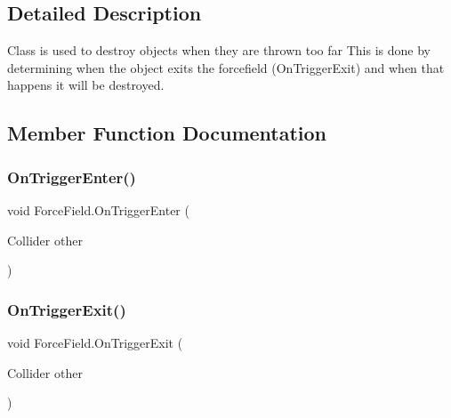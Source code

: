\subsection{Detailed Description}
Class is used to destroy objects when they are thrown too far This is done by determining when the object exits the forcefield (On\+Trigger\+Exit) and when that happens it will be destroyed. 



\subsection{Member Function Documentation}
\mbox{\label{class_force_field_aa8354be76d0c19d705db2cc025e8095e}} 
\subsubsection{\texorpdfstring{On\+Trigger\+Enter()}{OnTriggerEnter()}}
{\footnotesize\ttfamily void Force\+Field.\+On\+Trigger\+Enter (\begin{DoxyParamCaption}\item[{Collider}]{other }\end{DoxyParamCaption})\hspace{0.3cm}{\ttfamily [private]}}

\mbox{\label{class_force_field_a8ffe5c4cd5f6a4f2626f496760631c74}} 
\subsubsection{\texorpdfstring{On\+Trigger\+Exit()}{OnTriggerExit()}}
{\footnotesize\ttfamily void Force\+Field.\+On\+Trigger\+Exit (\begin{DoxyParamCaption}\item[{Collider}]{other }\end{DoxyParamCaption})\hspace{0.3cm}{\ttfamily [private]}}

\mbox{\label{class_force_field_a3a46258294cc671a8d35ebcc968602bb}} 
